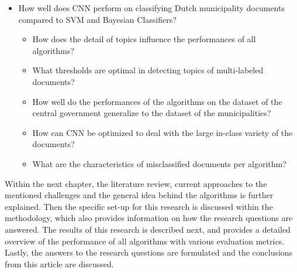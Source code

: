 \begin{itemize}
\item How well does CNN perform on classifying Dutch municipality documents compared to SVM and Bayesian Classifiers? 
\begin{itemize}
\item How does the detail of topics influence the performances of all algorithms?
\item What thresholds are optimal in detecting topics of multi-labeled documents?
\item How well do the performances of the algorithms on the dataset of the central government generalize to the dataset of the municipalities?
\item How can CNN be optimized to deal with the large in-class variety of the documents?
\item What are the characteristics of misclassified documents per algorithm?
\end{itemize}
\end{itemize}
Within the next chapter, the literature review, current approaches to the mentioned challenges and the general idea behind the algorithms is further explained. Then the specific set-up for this research is discussed within the methodology, which also provides information on how the research questions are answered. The results of this research is described next, and provides a detailed overview of the performance of all algorithms with various evaluation metrics. Lastly, the answers to the research questions are formulated and the conclusions from this article are discussed.

